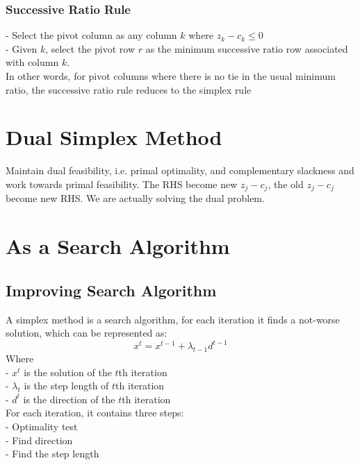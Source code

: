 				\subsubsection{Successive Ratio Rule}
					- Select the pivot column as any column $k$ where $z_k - c_k \le 0$\\
					- Given $k$, select the pivot row $r$ as the minimum successive ratio row associated with column $k$.\\
					In other words, for pivot columns where there is no tie in the usual minimum ratio, the successive ratio rule reduces to the simplex rule

		\section{Dual Simplex Method}
			Maintain dual feasibility, i.e. primal optimality, and complementary slackness and work towards primal feasibility.
			The RHS become new $z_j - c_j$, the old $z_j - c_j$ become new RHS. We are actually solving the dual problem.

		\section{As a Search Algorithm}
			\subsection{Improving Search Algorithm}
				A simplex method is a search algorithm, for each iteration it finds a not-worse solution, which can be represented as:\\
				\begin{equation}x^t = x^{t-1}+\lambda_{t-1}d^{t-1}  \end{equation}
				Where\\
				- $x^t$ is the solution of the $t$th iteration\\
				- $\lambda_t$ is the step length of $t$th iteration\\
				- $d^t$ is the direction of the $t$th iteration\\
				For each iteration, it contains three steps:\\
				- Optimality test\\
				- Find direction\\
				- Find the step length


